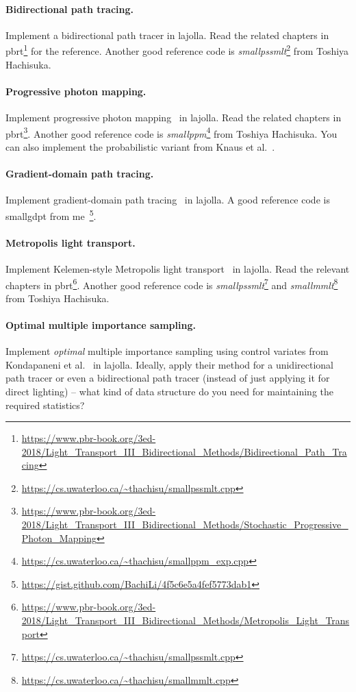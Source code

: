 \paragraph{Bidirectional path tracing.}
Implement a bidirectional path tracer in lajolla.
Read the related chapters in pbrt\footnote{\url{https://www.pbr-book.org/3ed-2018/Light_Transport_III_Bidirectional_Methods/Bidirectional_Path_Tracing}} for the reference.
Another good reference code is \textit{smallpssmlt}\footnote{\url{https://cs.uwaterloo.ca/~thachisu/smallpssmlt.cpp}} from Toshiya Hachisuka.

\paragraph{Progressive photon mapping.}
Implement progressive photon mapping~\cite{Hachisuka:2008:PPM} in lajolla.
Read the related chapters in pbrt\footnote{\url{https://www.pbr-book.org/3ed-2018/Light_Transport_III_Bidirectional_Methods/Stochastic_Progressive_Photon_Mapping}}.
Another good reference code is \textit{smallppm}\footnote{\url{https://cs.uwaterloo.ca/~thachisu/smallppm_exp.cpp}} from Toshiya Hachisuka.
You can also implement the probabilistic variant from Knaus et al.~\cite{Knaus:2011:PPM}.

\paragraph{Gradient-domain path tracing.} 
Implement gradient-domain path tracing~\cite{Kettunen:2015:GPT} in lajolla.
A good reference code is smallgdpt from me~\footnote{\url{https://gist.github.com/BachiLi/4f5c6e5a4fef5773dab1}}.

\paragraph{Metropolis light transport.} Implement Kelemen-style Metropolis light transport~\cite{Kelemen:2002:SRM} in lajolla. Read the relevant chapters in pbrt\footnote{\url{https://www.pbr-book.org/3ed-2018/Light_Transport_III_Bidirectional_Methods/Metropolis_Light_Transport}}. Another good reference code is \textit{smallpssmlt}\footnote{\url{https://cs.uwaterloo.ca/~thachisu/smallpssmlt.cpp}} and \textit{smallmmlt}\footnote{\url{https://cs.uwaterloo.ca/~thachisu/smallmmlt.cpp}} from Toshiya Hachisuka.

\paragraph{Optimal multiple importance sampling.}
Implement \emph{optimal} multiple importance sampling using control variates from Kondapaneni et al.~\cite{Kondapaneni:2019:OMI} in lajolla.
Ideally, apply their method for a unidirectional path tracer or even a bidirectional path tracer (instead of just applying it for direct lighting) -- what kind of data structure do you need for maintaining the required statistics?

